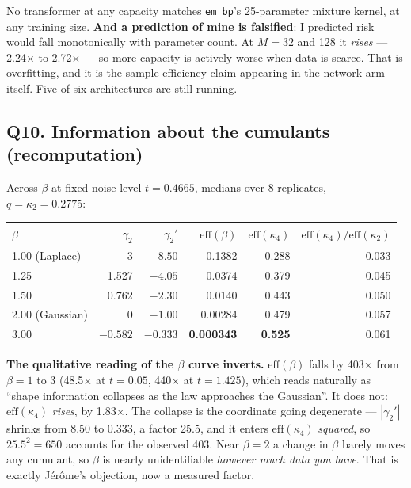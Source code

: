 \documentclass[10pt,a4paper]{article}
\newcommand{\nseq}{M}
\newcommand{\code}[1]{\texttt{\small #1}}
\newcommand{\st}[1]{\textbf{#1}}
\begin{document}
\medskip
No transformer at any capacity matches \code{em\_bp}'s 25-parameter mixture kernel, at any
training size. \st{And a prediction of mine is falsified}: I predicted risk would fall
monotonically with parameter count. At $\nseq=32$ and 128 it \emph{rises} --- 2.24$\times$ to
2.72$\times$ --- so more capacity is actively worse when data is scarce. That is overfitting,
and it is the sample-efficiency claim appearing in the network arm itself. Five of six
architectures are still running.

\subsection{Q10. Information about the cumulants (recomputation)}

Across $\beta$ at fixed noise level $t=0.4665$, medians over 8 replicates, $q=\kappa_2=0.2775$:

\medskip
\noindent\begin{tabular}{@{}l rrrrr@{}}
\toprule
$\beta$ & $\gamma_2$ & $\gamma_2'$ & $\mathrm{eff}(\beta)$ & $\mathrm{eff}(\kappa_4)$ & $\mathrm{eff}(\kappa_4)/\mathrm{eff}(\kappa_2)$ \\
\midrule
1.00 (Laplace) & 3 & $-8.50$ & 0.1382 & 0.288 & 0.033 \\
1.25 & 1.527 & $-4.05$ & 0.0374 & 0.379 & 0.045 \\
1.50 & 0.762 & $-2.30$ & 0.0140 & 0.443 & 0.050 \\
2.00 (Gaussian) & 0 & $-1.00$ & 0.00284 & 0.479 & 0.057 \\
3.00 & $-0.582$ & $-0.333$ & \st{0.000343} & \st{0.525} & 0.061 \\
\bottomrule
\end{tabular}

\medskip
\st{The qualitative reading of the $\beta$ curve inverts.} $\mathrm{eff}(\beta)$ falls by
403$\times$ from $\beta=1$ to 3 (48.5$\times$ at $t=0.05$, 440$\times$ at $t=1.425$), which
reads naturally as ``shape information collapses as the law approaches the Gaussian''. It does
not: $\mathrm{eff}(\kappa_4)$ \emph{rises}, by 1.83$\times$. The collapse is the coordinate
going degenerate --- $|\gamma_2'|$ shrinks from 8.50 to 0.333, a factor 25.5, and it enters
$\mathrm{eff}(\kappa_4)$ \emph{squared}, so $25.5^2 = 650$ accounts for the observed 403. Near
$\beta=2$ a change in $\beta$ barely moves any cumulant, so $\beta$ is nearly unidentifiable
\emph{however much data you have}. That is exactly Jérôme's objection, now a measured factor.
\end{document}
